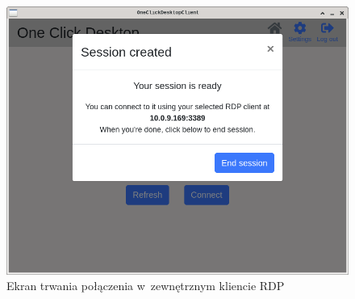 \documentclass[../opis-rozwiazania.tex]{subfiles}
\begin{document}
\begin{figure}[ht!]
  \centering
  \includegraphics[width=\textwidth]{resources/client_session_nordp.png}
  \caption{Ekran trwania połączenia w~zewnętrznym kliencie RDP}
  \label{figure:system_interaction.client.session_nordp}
\end{figure}
\end{document}
